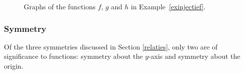 \begin{example}
\begin{figure}[H]
\centering
\centerline{
\hspace{0.1cm}
\hspace{0.1cm}
}
\caption{Graphs of the functions $f$, $g$ and $h$ in Example~\ref{exinjectief}. }
\label{fig_functions_16}
\end{figure}



\end{example}


\subsubsection{Symmetry}
Of the three symmetries discussed in Section \ref{relaties}, only two are of significance to functions:  symmetry about the $y$-axis and symmetry about the origin. 



